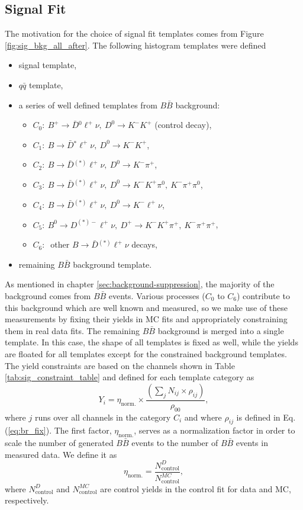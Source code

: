\subsection{Signal Fit}\label{sec:templates-in-signal-fits}
The motivation for the choice of signal fit templates comes from Figure \ref{fig:sig_bkg_all_after}. The following histogram templates were defined
\begin{itemize}
	\item signal template,
	\item $q \bar q$ template,
	\item a series of well defined templates from $B \bar B$ background:
	\begin{itemize}
		\item $C_0:~B^+ \to \bar{D} {}^0 \ell^+ \nu,~D^0 \to K^-K^+$ (control decay),
		\item $C_1:~B \to \bar{D} {}^* \ell^+ \nu,~D^0 \to K^-K^+$,
		\item $C_2:~B \to \bar{D} {}^{(*)} \ell^+ \nu,~D^0 \to K^-\pi^+$,
		\item $C_3:~B \to \bar{D} {}^{(*)} \ell^+ \nu,~D^0 \to K^-K^+\pi^0,~K^-\pi^+\pi^0$,
		\item $C_4:~B \to \bar{D} {}^{(*)} \ell^+ \nu,~D^0 \to K^-\ell^+\nu$,
		\item $C_5:~B^0 \to D^{(*)-} \ell^+ \nu,~D^+ \to K^-K^+\pi^+,~K^-\pi^+\pi^+$,
		\item $C_6:~$ other $B \to \bar D {}^{(*)} \ell^+ \nu$ decays,
	\end{itemize}
	\item remaining $B \bar B$ background template.
\end{itemize}
As mentioned in chapter \ref{sec:background-suppression}, the majority of the background comes from $B \bar B$ events. Various processes ($C_0$ to $C_6$) contribute to this background which are well known and measured, so we make use of these measurements by fixing their yields in MC fits and appropriately constraining them in real data fits. The remaining $B \bar B$ background is merged into a single template. In this case, the shape of all templates is fixed as well, while the yields are floated for all templates except for the constrained background templates. The yield constraints are based on the channels shown in Table \ref{tab:sig_constraint_table} and defined for each template category as 
\begin{equation}
Y_i = \eta_{\mathrm{norm.}} \times \frac{\left(\sum_j N_{ij}\times \rho_{ij} \right)}{\rho_{00}},
\label{eq:sig_fix}
\end{equation}
where $j$ runs over all channels in the category $C_i$ and where $\rho_{ij}$ is defined in Eq. (\ref{eq:br_fix}). The first factor, $\eta_{\mathrm{norm.}}$, serves as a normalization factor in order to scale the number of generated $B \bar B$ events to the number of $B \bar B$ events in measured data. We define it as
\begin{equation}
\eta_{\mathrm{norm.}} = \frac{N_{\mathrm{control}}^D}{N_{\mathrm{control}}^{MC}},
\end{equation}
where $N_{\mathrm{control}}^D$ and $N_{\mathrm{control}}^{MC}$ are control yields in the control fit for data and MC, respectively.

